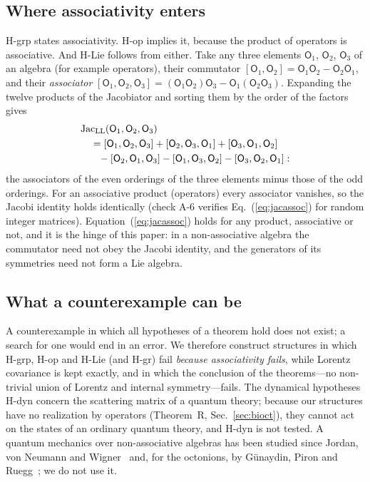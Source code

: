 \subsection{Where associativity enters}

H-grp states associativity. H-op implies it, because the product of operators is associative. And
H-Lie follows from either. Take any three elements $\mathsf O_1$, $\mathsf O_2$, $\mathsf O_3$ of an
algebra (for example operators), their commutator $[\mathsf O_1,\mathsf O_2]=\mathsf O_1\mathsf
O_2-\mathsf O_2\mathsf O_1$, and their \emph{associator}
$[\mathsf O_1,\mathsf O_2,\mathsf O_3]=(\mathsf O_1\mathsf O_2)\mathsf O_3-\mathsf O_1(\mathsf O_2\mathsf O_3)$.
Expanding the twelve products of the Jacobiator and sorting them by the order of the factors gives
\begin{align}
&\mathrm{Jac}_{\rm LL}(\mathsf O_1,\mathsf O_2,\mathsf O_3)\nonumber\\
&\quad=[\mathsf O_1,\mathsf O_2,\mathsf O_3]+[\mathsf O_2,\mathsf O_3,\mathsf O_1]+[\mathsf O_3,\mathsf O_1,\mathsf O_2]\nonumber\\
&\quad\phantom{=}-[\mathsf O_2,\mathsf O_1,\mathsf O_3]-[\mathsf O_1,\mathsf O_3,\mathsf O_2]-[\mathsf O_3,\mathsf O_2,\mathsf O_1]:
\label{eq:jacassoc}
\end{align}
the associators of the even orderings of the three elements minus those of the odd orderings. For an
associative product (operators) every associator vanishes, so the Jacobi identity holds identically (check A-6 verifies Eq.~(\ref{eq:jacassoc}) for random integer
matrices). Equation~(\ref{eq:jacassoc}) holds for any product, associative or not, and it is the hinge
of this paper: in a non-associative algebra the commutator need not obey the Jacobi identity, and the
generators of its symmetries need not form a Lie algebra.

\subsection{What a counterexample can be}

A counterexample in which all hypotheses of a theorem hold does not exist; a search for one would end
in an error. We therefore construct structures in which H-grp, H-op and H-Lie (and H-gr) fail
\emph{because associativity fails}, while Lorentz covariance is kept exactly, and in which the
conclusion of the theorems---no non-trivial union of Lorentz and internal symmetry---fails. The
dynamical hypotheses H-dyn concern the scattering matrix of a quantum theory; because our structures
have no realization by operators (Theorem~R, Sec.~\ref{sec:bioct}), they cannot act on the states of an
ordinary quantum theory, and H-dyn is not tested. A quantum mechanics over non-associative algebras has
been studied since Jordan, von Neumann and Wigner~\cite{JordanNeumannWigner1934} and, for the octonions,
by G\"unaydin, Piron and Ruegg~\cite{GunaydinPironRuegg1978}; we do not use it.
